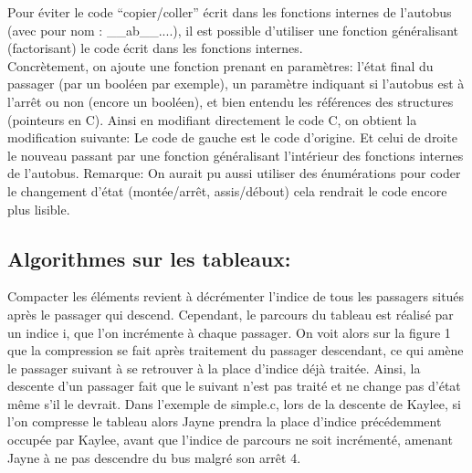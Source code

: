 \documentclass{article}
\begin{document}
\par
Pour éviter le code “copier/coller” écrit dans les fonctions internes de l’autobus (avec
pour nom : \_\_ab\_\_....), il est possible d’utiliser une fonction généralisant (factorisant) le code écrit dans les fonctions internes. \\
Concrètement, on ajoute une fonction prenant en paramètres: l’état final du passager
(par un booléen par exemple), un paramètre indiquant si l’autobus est à l'arrêt ou non (encore un booléen), et bien entendu les références des structures (pointeurs en C).
Ainsi en modifiant directement le code C, on obtient la modification suivante:
Le code de gauche est le code d’origine. Et celui de droite le nouveau passant par une
fonction généralisant l'intérieur des fonctions internes de l’autobus.\newline
Remarque: On aurait pu aussi utiliser des énumérations pour coder le changement d’état
(montée/arrêt, assis/débout) cela rendrait le code encore plus lisible.\newline
\subsection{Algorithmes sur les tableaux:}
Compacter les éléments revient à décrémenter l’indice de tous les passagers situés
après le passager qui descend. Cependant, le parcours du tableau est réalisé par un indice i, que l’on incrémente à chaque passager.
On voit alors sur la figure 1 que la compression se fait après traitement du passager
descendant, ce qui amène le passager suivant à se retrouver à la place d’indice déjà traitée. Ainsi, la descente d’un passager fait que le suivant n’est pas traité et ne change pas d’état même s’il le devrait.
\newline
\newline
Dans l’exemple de simple.c, lors de la descente de Kaylee, si l’on compresse le
tableau alors Jayne prendra la place d’indice précédemment occupée par Kaylee, avant que
l’indice de parcours ne soit incrémenté, amenant Jayne à ne pas descendre du bus malgré
son arrêt 4.
\end{document}

